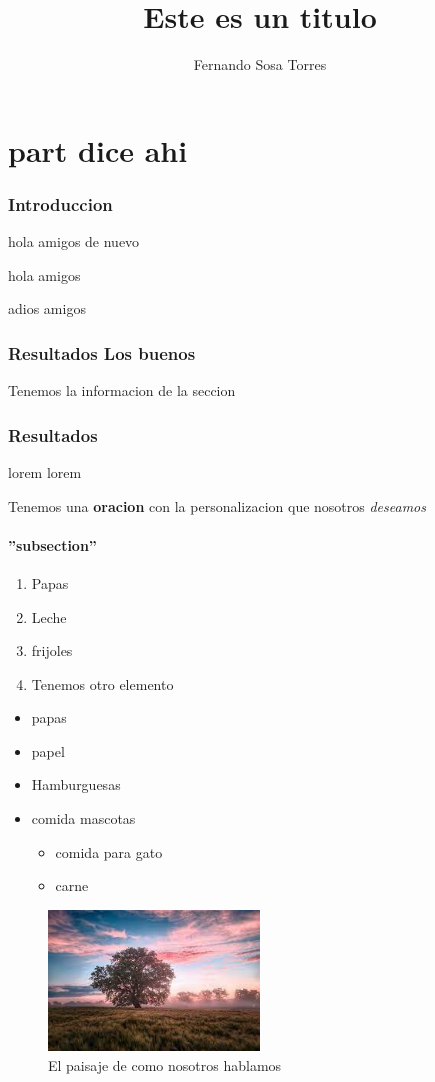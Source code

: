 \documentclass[10pt,a4paper]{article}
\title{Este es un titulo}
\author{Fernando Sosa Torres}
\begin{document}
\maketitle
\part{part dice ahi}
\section{Introduccion} 
hola amigos de nuevo
\blindtext

hola amigos

adios amigos
\section{Resultados Los buenos}
Tenemos la informacion de la seccion
\section{Resultados}
lorem lorem

Tenemos una \textbf{oracion} con la personalizacion que nosotros \textit{deseamos}
\subsection{''subsection''}

\begin{enumerate}
	\item Papas
	\item Leche
	\item frijoles
	\item Tenemos otro elemento
\end{enumerate}
\begin{itemize}
	\item papas
	\item papel
	\item Hamburguesas
	\item comida mascotas
	\begin{itemize}
		\item comida para gato
		\item carne
	\end{itemize}
\end{itemize}

\begin{figure}[H]
\centering
\includegraphics[width=0.5\textwidth]{imagen}
\caption{El paisaje de como nosotros hablamos}
\label{paisaje}
\end{figure}
\end{document}
